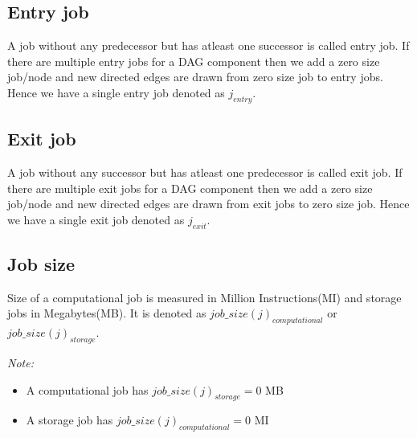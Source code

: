 \subsection{Entry job}
A job without any predecessor but has atleast one successor is called entry job. If there are multiple entry jobs for a DAG component then we add a zero size job/node and new directed edges are drawn from zero size job to entry jobs. Hence we have a single entry job denoted as $j_{entry}$.
\subsection{Exit job}
A job without any successor but has atleast one predecessor is called exit job. If there are multiple exit jobs for a DAG component then we add a zero size job/node and new directed edges are drawn from  exit jobs to zero size job. Hence we have a single exit job denoted as $j_{exit}$.
\subsection{Job size}
Size of a computational job is measured in Million Instructions(MI) and storage jobs in Megabytes(MB). It is denoted as $job\_size(j)_{computational}$ or $job\_size(j)_{storage}$. 

\begin{framed}
{\small
\emph{Note:}
\begin{itemize}
\item A computational job has $job\_size(j)_{storage} =0$ MB
\item A storage job has $job\_size(j)_{computational}=0$ MI
\end{itemize}
}
\end{framed}


